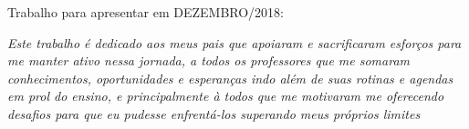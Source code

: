 \documentclass[	12pt, Times, openright, twoside, a4paper, english, brazil]{abntex2}
\begin{document}
    \begin{folhadeaprovacao}
      \begin{center}
        {\ABNTEXchapterfont\large\imprimirautor}

        \vspace*{\fill}\vspace*{\fill}
        {\ABNTEXchapterfont\bfseries\Large\imprimirtitulo}
        \vspace*{\fill}
        
        \hspace{.45\textwidth}
        \begin{minipage}{.5\textwidth}
            \imprimirpreambulo
        \end{minipage}%
        \vspace*{\fill}
       \end{center}
        
       Trabalho para apresentar em DEZEMBRO/2018:

          
       \begin{center}
        \vspace*{0.5cm}
        {\large\imprimirlocal}
        \par
        {\large\imprimirdata}
        \vspace*{1cm}
      \end{center}
      
    \end{folhadeaprovacao}

    \begin{dedicatoria}
       \vspace*{\fill}
       \centering
       \noindent
       \textit{ Este trabalho é dedicado aos meus pais que apoiaram e sacrificaram esforços para me manter ativo nessa jornada, a todos os professores que me somaram conhecimentos, oportunidades e esperanças indo além de suas rotinas e agendas em prol do ensino, e principalmente à todos que me motivaram me oferecendo desafios para que eu pudesse enfrentá-los superando meus próprios limites } \vspace*{\fill}
    \end{dedicatoria}
\end{document}
